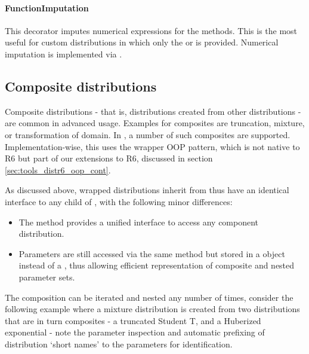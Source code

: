 \paragraph{FunctionImputation} This decorator imputes numerical expressions for the  methods. This is the most useful for custom distributions in which only the  or  is provided. Numerical imputation is implemented via .

\subsection{Composite distributions}
\label{sec:tools_distr6_api_wrap}

Composite distributions - that is, distributions created from other distributions - are common in advanced usage. Examples for composites are truncation, mixture, or transformation of domain. In , a number of such composites are supported. Implementation-wise, this uses the wrapper OOP pattern, which is not native to R6 but part of our extensions to R6, discussed in section \ref{sec:tools_distr6_oop_cont}.

As discussed above, wrapped distributions inherit from  thus have an identical interface to any child of , with the following minor differences:
\begin{itemize}
\itemsep-0.2em
\item The  method provides a unified interface to access any component distribution.
\item Parameters are still accessed via the same method but stored in a  object instead of a , thus allowing efficient representation of composite and nested parameter sets.
\end{itemize}

The composition can be iterated and nested any number of times, consider the following example where a mixture distribution is created from two distributions that are in turn composites - a truncated Student T, and a Huberized exponential - note the parameter inspection and automatic prefixing of distribution `short names' to the parameters for identification.

